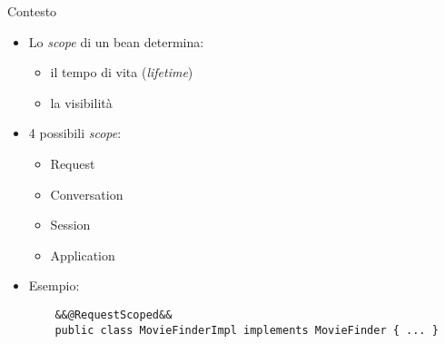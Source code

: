 \begin{frame}[fragile]{Contesto}

\begin{itemize}
\item Lo \textsl{scope} di un bean determina:

	\begin{itemize}
	
	\vspace{0.3em}
	
	\item il tempo di vita (\textsl{lifetime})
	
	\vspace{0.5em}
	
	\item la visibilità
	\end{itemize}

\vspace{0.7em}

\item 4 possibili \textsl{scope}:
	\begin{itemize}
	
	\vspace{0.3em}
	
	\item Request
	
	\vspace{0.5em}
	
	\item Conversation
	
	\vspace{0.5em}
	
	\item Session
	
	\vspace{0.5em}
	
	\item Application
	\end{itemize}
	
\vspace{0.7em}

\item Esempio:
	\begin{lstlisting}
	&&@RequestScoped&&
	public class MovieFinderImpl implements MovieFinder { ... }
	\end{lstlisting}

\end{itemize}

\end{frame}



